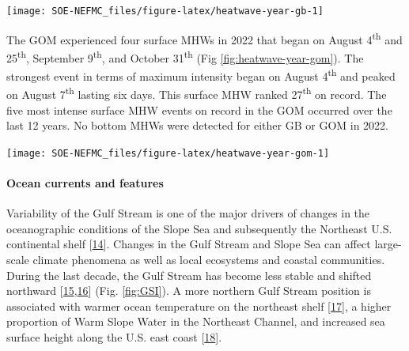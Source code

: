 \documentclass[
  10pt,
]{article}
\let\origfigure\figure
\let\endorigfigure\endfigure
\renewenvironment{figure}[1][2] {
    \expandafter\origfigure\expandafter[H]
} {
    \endorigfigure
}
\begin{document}
\begin{figure}

{\centering \texttt{[image: SOE-NEFMC\_files/figure-latex/heatwave-year-gb-1]} 

}

\caption{Marine heatwave events (red shading above black line) on Georges Bank occuring in 2022.}\label{fig:heatwave-year-gb}
\end{figure}

The GOM experienced four surface MHWs in 2022 that began on August 4\textsuperscript{th} and 25\textsuperscript{th}, September 9\textsuperscript{th}, and October 31\textsuperscript{th} (Fig \ref{fig:heatwave-year-gom}). The strongest event in terms of maximum intensity began on August 4\textsuperscript{th} and peaked on August 7\textsuperscript{th} lasting six days. This surface MHW ranked 27\textsuperscript{th} on record. The five most intense surface MHW events on record in the GOM occurred over the last 12 years. No bottom MHWs were detected for either GB or GOM in 2022.

\begin{figure}

{\centering \texttt{[image: SOE-NEFMC\_files/figure-latex/heatwave-year-gom-1]} 

}

\caption{Marine heatwave events (red shading above black line) in the Gulf of Maine occuring in 2022.}\label{fig:heatwave-year-gom}
\end{figure}

\hypertarget{ocean-currents-and-features}{%
\paragraph{Ocean currents and features}\label{ocean-currents-and-features}}

Variability of the Gulf Stream is one of the major drivers of changes in the oceanographic conditions of the Slope Sea and subsequently the Northeast U.S. continental shelf {[}\protect\hyperlink{ref-gangopadhyay_census_2020}{14}{]}. Changes in the Gulf Stream and Slope Sea can affect large-scale climate phenomena as well as local ecosystems and coastal communities. During the last decade, the Gulf Stream has become less stable and shifted northward {[}\protect\hyperlink{ref-andres_recent_2016}{15},\protect\hyperlink{ref-caesar_observed_2018}{16}{]} (Fig. \ref{fig:GSI}). A more northern Gulf Stream position is associated with warmer ocean temperature on the northeast shelf {[}\protect\hyperlink{ref-zhang_role_2007}{17}{]}, a higher proportion of Warm Slope Water in the Northeast Channel, and increased sea surface height along the U.S. east coast {[}\protect\hyperlink{ref-goddard_extreme_2015}{18}{]}.
\end{document}
